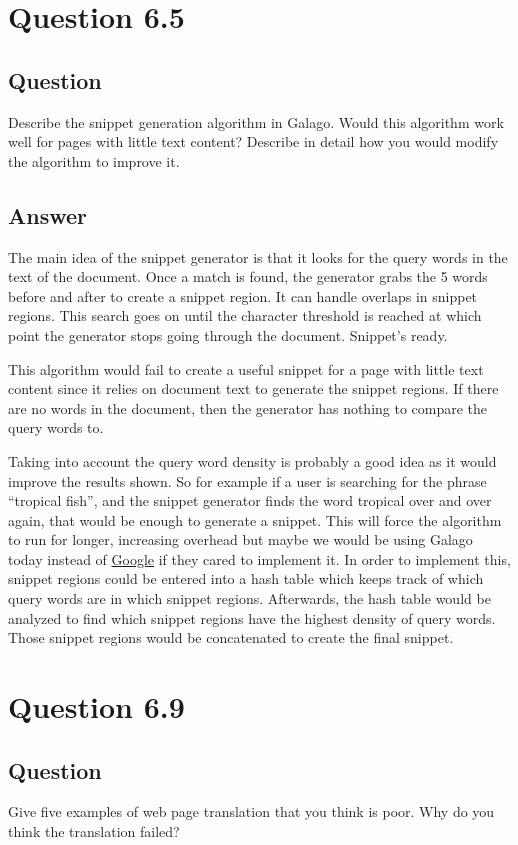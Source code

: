 \documentclass[10pt,letterpaper,bibliography=totoc]{scrartcl}
\begin{document}
\section{Question 6.5}

\subsection{Question}
Describe the snippet generation algorithm in Galago. Would this algorithm
work well for pages with little text content? Describe in detail how you would
modify the algorithm to improve it.

\subsection{Answer}
The main idea of the snippet generator is that it looks for the query words in the text of the document. Once a match is found, the generator grabs the 5 words before and after to create a snippet region. It can handle overlaps in snippet regions. This search goes on until the character threshold is reached at which point the generator stops going through the document. Snippet's ready. 

This algorithm would fail to create a useful snippet for a page with little text content since it relies on document text to generate the snippet regions. If there are no words in the document, then the generator has nothing to compare the query words to.

Taking into account the query word density is probably a good idea as it would improve the results shown. So for example if a user is searching for the phrase ``tropical fish'', and the snippet generator finds the word tropical over and over again, that would be enough to generate a snippet. This will force the algorithm to run for longer, increasing overhead but maybe we would be using Galago today instead of \href{www.google.com}{Google} if they cared to implement it. In order to implement this, snippet regions could be entered into a hash table which keeps track of which query words are in which snippet regions. Afterwards, the hash table would be analyzed to find which snippet regions have the highest density of query words. Those snippet regions would be concatenated to create the final snippet.

\section{Question 6.9}
\subsection {Question}
Give five examples of web page translation that you think is poor. Why do you think the translation failed?
\end{document}
